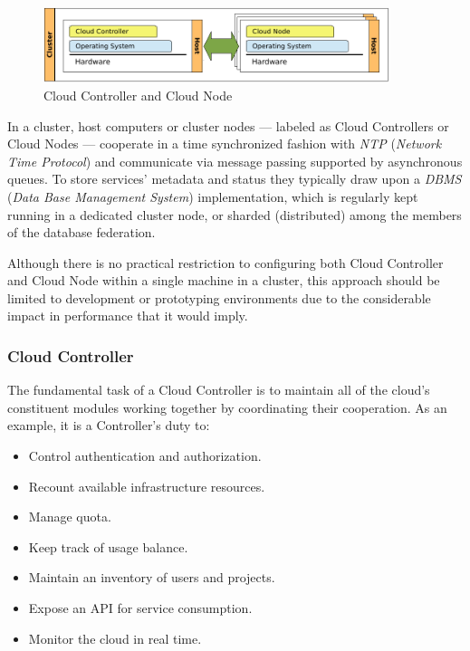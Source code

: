 \begin{figure}[tbp]
\begin{center}
\includegraphics[width=0.9\textwidth]{imagenes/004.pdf}
 \caption{Cloud Controller and Cloud Node}
\label{fig:archcloud}
\end{center}
\end{figure}

In a cluster, host computers or cluster nodes --- labeled as Cloud Controllers or Cloud Nodes --- cooperate in a time synchronized fashion with \emph{NTP} (\emph{Network Time Protocol}) and communicate via message passing supported by asynchronous queues. To store services' metadata and status they typically draw upon a \emph{DBMS} (\emph{Data Base Management System}) implementation, which is regularly kept running in a dedicated cluster node, or sharded (distributed) among the members of the database federation.

Although there is no practical restriction to configuring both Cloud Controller and Cloud Node within a single machine in a cluster, this approach should be limited to development or prototyping environments due to the considerable impact in performance that it would imply.

\subsubsection{Cloud Controller}\label{subsubsec:cloudcontroller}
\noindent The fundamental task of a Cloud Controller is to maintain all of the cloud's constituent modules working together by coordinating their cooperation. As an example, it is a Controller's duty to:

\begin{itemize}
 \item Control authentication and authorization.
 \item Recount available infrastructure resources.
 \item Manage quota.
 \item Keep track of usage balance.
 \item Maintain an inventory of users and projects.
 \item Expose an API for service consumption.
 \item Monitor the cloud in real time.
\end{itemize}

